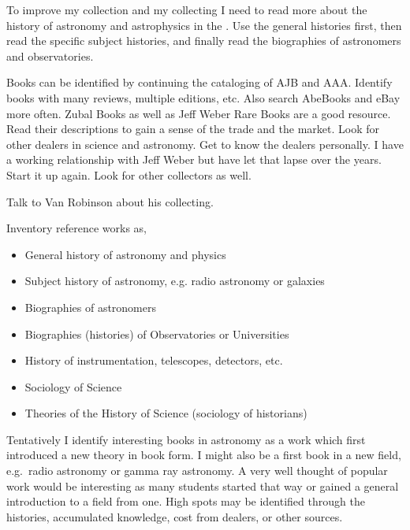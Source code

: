 \documentclass[letterpaper]{article}
\begin{document}
To improve my collection and my collecting I need to read more about
the history of astronomy and astrophysics in the . Use the
general histories first, then read the specific subject histories, and
finally read the biographies of astronomers and observatories.

Books can be identified by continuing the cataloging of AJB and AAA.
Identify books with many reviews, multiple editions, etc.
Also search AbeBooks and eBay more often. Zubal Books as well as Jeff
Weber Rare Books are a good resource. Read their descriptions to gain a
sense of the trade and the market. Look for other dealers in
 science and astronomy. Get to know the dealers personally. I
have a working relationship with Jeff Weber but have let that lapse
over the years. Start it up again. Look for other collectors as well.

Talk to Van Robinson about his collecting.

Inventory reference works as,
\begin{itemize}
\item General history of astronomy and physics
\item Subject history of astronomy, e.g. radio astronomy or galaxies
\item Biographies of astronomers
\item Biographies (histories) of Observatories or Universities
\item History of instrumentation, telescopes, detectors, etc.
\item Sociology of Science
\item Theories of the History of Science (sociology of historians)
\end{itemize}

Tentatively I identify interesting books in  astronomy as a
work which first introduced a new theory in book form. I might also be
a first book in a new field, e.g.\ radio astronomy or gamma ray
astronomy. A very well thought of popular work would be interesting as
many students started that way or gained a general introduction to a
field from one. High spots may be identified through
the histories, accumulated knowledge, cost from dealers, or other
sources.

\printbibliography
\end{document}
